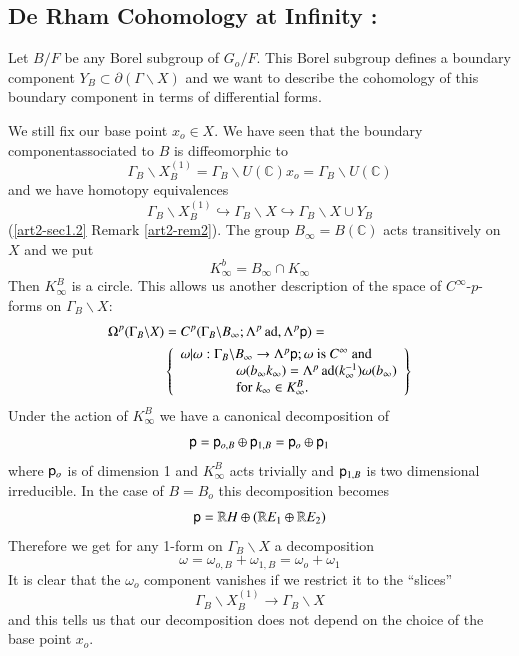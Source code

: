 \subsection{De Rham Cohomology at Infinity :}\label{art2-sec1.5}
Let $B/F$ be any Borel subgroup of $G_{o}/F$. This Borel subgroup defines a boundary component $Y_{B}\subset \partial (\Gamma\backslash X)$ and we want to describe the cohomology of this boundary component in terms of differential forms.

We still fix our base point $x_{o}\in X$. We have seen that the boundary component\pageoriginale associated to $B$ is diffeomorphic to
$$
\Gamma_{B}\backslash X^{(1)}_{B}=\Gamma_{B}\backslash U(\mathbb{C})x_{o}=\Gamma_{B}\backslash U(\mathbb{C})
$$
and we have homotopy equivalences
$$
\Gamma_{B}\backslash X^{(1)}_{B}\hookrightarrow \Gamma_{B}\backslash X\hookrightarrow \Gamma_{B}\backslash X\cup Y_{B}
$$
(\ref{art2-sec1.2} Remark \ref{art2-rem2}). The group $B_{\infty}=B(\mathbb{C})$ acts transitively on $X$ and we put
$$
K^{b}_{\infty}=B_{\infty}\cap K_{\infty}
$$
Then $K^{B}_{\infty}$ is a circle. This allows us another description of the space of $C^{\infty}$-$p$-forms on $\Gamma_{B}\backslash X$:
\begin{align*}
& \Omega^{p}(\Gamma_{B}\backslash X)=C^{p}(\Gamma_{B}\backslash B_{\infty};\Lambda^{p}\operatorname{ad},\Lambda^{p}\mathsf{p})=\\
& \qquad\qquad
\left\{
\begin{array}{l}
\omega|\omega:\Gamma_{B}\backslash B_{\infty}\to \Lambda^{p}\mathsf{p};\omega\text{~ is~ }C^{\infty}\text{~ and}\\
\qquad\qquad \omega(b_{\infty}k_{\infty})=\Lambda^{p}\operatorname{ad}(k^{-1}_{\infty})\omega(b_{\infty})\\
\qquad\qquad \text{for~ } k_{\infty}\in K^{B}_{\infty}.
\end{array}
\right\}
\end{align*}
Under the action of $K^{B}_{\infty}$ we have a canonical decomposition of
$$
\mathsf{p}=\mathsf{p}_{o,B}\oplus \mathsf{p}_{1,B}=\mathsf{p}_{o}\oplus \mathsf{p}_{1}
$$
where $\mathsf{p}_{o}$ is of dimension 1 and $K^{B}_{\infty}$ acts trivially and $\mathsf{p}_{1,B}$ is two dimensional irreducible. In the case of $B=B_{o}$ this decomposition becomes
$$
\mathsf{p}=\mathbb{R} H \oplus (\mathbb{R} E_{1}\oplus \mathbb{R}  E_{2})
$$
Therefore we get for any 1-form on $\Gamma_{B}\backslash X$ a decomposition
$$
\omega=\omega_{o,B}+\omega_{1,B}=\omega_{o}+\omega_{1}
$$
It is clear that the $\omega_{o}$ component vanishes if we restrict it to the ``slices''
$$
\Gamma_{B}\backslash X_{B}^{(1)}\to \Gamma_{B}\backslash X
$$
and this tells us that our decomposition does not depend on the choice of the base point $x_{o}$.

